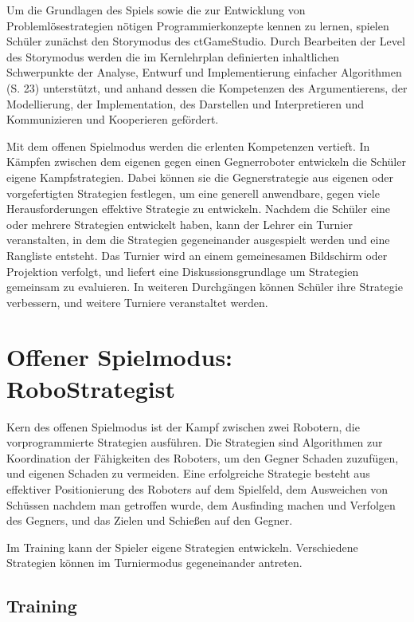 Um die Grundlagen des Spiels sowie die zur Entwicklung von Problemlösestrategien nötigen
Programmierkonzepte kennen zu lernen, spielen Schüler zunächst den Storymodus des ctGameStudio.
Durch Bearbeiten der Level des Storymodus werden die im Kernlehrplan definierten inhaltlichen
Schwerpunkte der Analyse, Entwurf und Implementierung einfacher Algorithmen (S. 23) unterstützt, und
anhand dessen die Kompetenzen des Argumentierens, der Modellierung, der Implementation, des
Darstellen und Interpretieren und Kommunizieren und Kooperieren gefördert.

Mit dem offenen Spielmodus werden die erlenten Kompetenzen vertieft. In Kämpfen zwischen dem eigenen
gegen einen Gegnerroboter entwickeln die Schüler eigene Kampfstrategien. Dabei können sie die
Gegnerstrategie aus eigenen oder vorgefertigten Strategien festlegen, um eine generell anwendbare,
gegen viele Herausforderungen effektive Strategie zu entwickeln. Nachdem die Schüler eine oder
mehrere Strategien entwickelt haben, kann der Lehrer ein Turnier veranstalten, in dem die Strategien
gegeneinander ausgespielt werden und eine Rangliste entsteht. Das Turnier wird an einem gemeinesamen
Bildschirm oder Projektion verfolgt, und liefert eine Diskussionsgrundlage um Strategien gemeinsam
zu evaluieren. In weiteren Durchgängen können Schüler ihre Strategie verbessern, und weitere
Turniere veranstaltet werden.


\section{Offener Spielmodus: RoboStrategist}

Kern des offenen Spielmodus ist der Kampf zwischen zwei Robotern, die vorprogrammierte Strategien
ausführen. Die Strategien sind Algorithmen zur Koordination der Fähigkeiten des Roboters, um den
Gegner Schaden zuzufügen, und eigenen Schaden zu vermeiden. Eine erfolgreiche Strategie besteht aus
effektiver Positionierung des Roboters auf dem Spielfeld, dem Ausweichen von Schüssen nachdem man
getroffen wurde, dem Ausfinding machen und Verfolgen des Gegners, und das Zielen und Schießen auf
den Gegner.

Im Training kann der Spieler eigene Strategien entwickeln. Verschiedene Strategien können im
Turniermodus gegeneinander antreten.



\subsection{Training}


